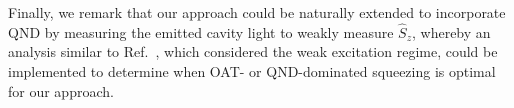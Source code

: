 \documentclass[11pt]{article}
\begin{document}
Finally, we remark that our approach could be naturally extended to incorporate QND by measuring the emitted cavity light to weakly measure $\hat S_z$, whereby an analysis similar to Ref.~\cite{Barberena2023b}, which considered the weak excitation regime, could be implemented to determine when OAT- or QND-dominated squeezing is optimal for our approach.
\end{document}
